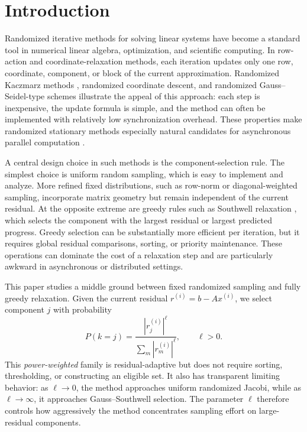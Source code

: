 \documentclass[pdflatex,sn-mathphys-num]{sn-jnl}%
\theoremstyle{thmstyleone}%
\theoremstyle{thmstyletwo}%
\theoremstyle{thmstylethree}%
\begin{document}



\maketitle

\section{Introduction}
\label{sec:intro}

Randomized iterative methods for solving linear systems have become a standard
tool in numerical linear algebra, optimization, and scientific computing.  In
row-action and coordinate-relaxation methods, each iteration updates only one
row, coordinate, component, or block of the current approximation.  Randomized
Kaczmarz methods \cite{strohmer2009randomized}, randomized coordinate descent,
and randomized Gauss--Seidel-type schemes \cite{leventhal2010randomized}
illustrate the appeal of this approach: each step is inexpensive, the update
formula is simple, and the method can often be implemented with relatively low
synchronization overhead.  These properties make randomized stationary methods
especially natural candidates for asynchronous parallel computation
\cite{avron2015revisiting}.

A central design choice in such methods is the component-selection rule.  The
simplest choice is uniform random sampling, which is easy to implement and
analyze.  More refined fixed distributions, such as row-norm or
diagonal-weighted sampling, incorporate matrix geometry but remain independent
of the current residual.  At the opposite extreme are greedy rules such as
Southwell relaxation \cite{southwell1946relaxation}, which
selects the component with the largest residual or largest predicted progress.
Greedy selection can be substantially more efficient per iteration, but it
requires global residual comparisons, sorting, or priority maintenance.  These
operations can dominate the cost of a relaxation step and are particularly
awkward in asynchronous or distributed settings.

This paper studies a middle ground between fixed randomized sampling and fully
greedy relaxation.  Given the current residual $r^{(i)}=b-Ax^{(i)}$, we select
component $j$ with probability
\[
    P(k=j) =
    \frac{|r_j^{(i)}|^\ell}{\sum_m |r_m^{(i)}|^\ell},
    \qquad \ell>0.
\]
This \emph{power-weighted} family is residual-adaptive but does not require
sorting, thresholding, or constructing an eligible set.  It also has transparent
limiting behavior: as $\ell \to 0$, the method approaches uniform randomized
Jacobi, while as $\ell \to \infty$, it approaches Gauss--Southwell selection.  The
parameter $\ell$ therefore controls how aggressively the method concentrates
sampling effort on large-residual components.
\end{document}
